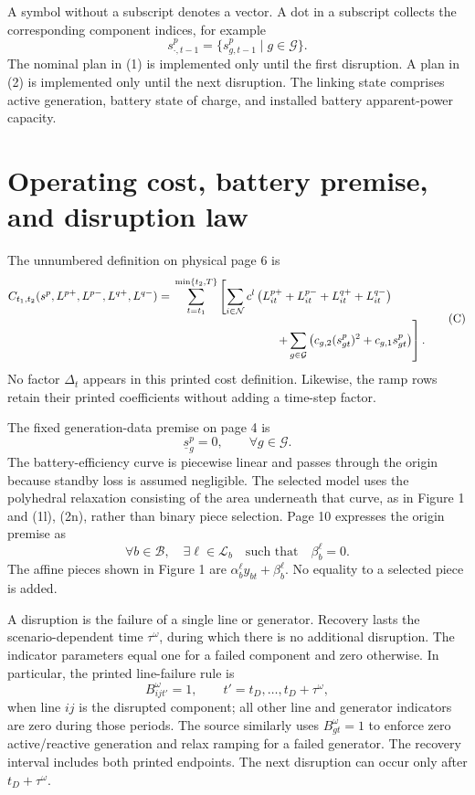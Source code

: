 \documentclass[10pt]{article}
\begin{document}
A symbol without a subscript denotes a vector. A dot in a subscript collects the corresponding component indices, for example
\[
s_{\cdot,t-1}^p=\{s_{g,t-1}^p\mid g\in\mathcal G\}.
\]
The nominal plan in (1) is implemented only until the first disruption. A plan in (2) is implemented only until the next disruption. The linking state comprises active generation, battery state of charge, and installed battery apparent-power capacity.

\section*{Operating cost, battery premise, and disruption law}
The unnumbered definition on physical page 6 is
\begin{equation}
\begin{aligned}
C_{t_1,t_2}(s^p,L^{p+},L^{p-},L^{q+},L^{q-})
={}&\sum_{t=t_1}^{\min\{t_2,T\}}\left[\sum_{i\in\mathcal N}c^l\left(L_{it}^{p+}+L_{it}^{p-}+L_{it}^{q+}+L_{it}^{q-}\right)\right.\\
&\left.\hspace{31mm}+\sum_{g\in\mathcal G}\left(c_{g,2}(s_{gt}^p)^2+c_{g,1}s_{gt}^p\right)\right].
\end{aligned}\tag{C}
\end{equation}
No factor $\Delta_t$ appears in this printed cost definition. Likewise, the ramp rows retain their printed coefficients without adding a time-step factor.

The fixed generation-data premise on page 4 is
\[
\underline s_g^p=0,\qquad\forall g\in\mathcal G.
\]
The battery-efficiency curve is piecewise linear and passes through the origin because standby loss is assumed negligible. The selected model uses the polyhedral relaxation consisting of the area underneath that curve, as in Figure 1 and (1l), (2n), rather than binary piece selection. Page 10 expresses the origin premise as
\[
\forall b\in\mathcal B,\quad\exists\ell\in\mathcal L_b\quad\text{such that}\quad\beta_b^\ell=0.
\]
The affine pieces shown in Figure 1 are $\alpha_b^\ell y_{bt}+\beta_b^\ell$. No equality to a selected piece is added.

A disruption is the failure of a single line or generator. Recovery lasts the scenario-dependent time $\tau^\omega$, during which there is no additional disruption. The indicator parameters equal one for a failed component and zero otherwise. In particular, the printed line-failure rule is
\[
B_{ijt'}^\omega=1,\qquad t'=t_D,\ldots,t_D+\tau^\omega,
\]
when line $ij$ is the disrupted component; all other line and generator indicators are zero during those periods. The source similarly uses $B_{gt}^\omega=1$ to enforce zero active/reactive generation and relax ramping for a failed generator. The recovery interval includes both printed endpoints. The next disruption can occur only after $t_D+\tau^\omega$.
\end{document}

